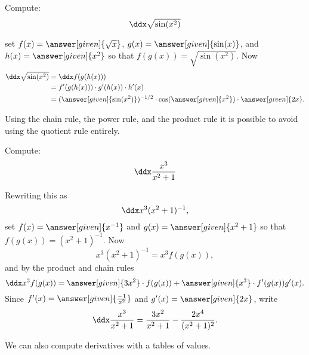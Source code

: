 \documentclass{ximera}
\begin{document}
\begin{example}
Compute:
\[
\ddx \sqrt{\sin(x^2)}
\]

\begin{explanation}
set $f(x) = \answer[given]{\sqrt{x}}$, $g(x) = \answer[given]{\sin(x)}$, and $h(x) = \answer[given]{x^2}$
so that $f(g(x)) = \sqrt{\sin(x^2)}$. Now
\begin{align*}
  \ddx \sqrt{\sin(x^2)} &= \ddx f(g(h(x)))\\
  &= f'(g(h(x))) \cdot g'(h(x)) \cdot h'(x)\\
  &= (\answer[given]{\sin(x^2)})^{-1/2} \cdot \cos(\answer[given]{x^2}) \cdot \answer[given]{2x}.
\end{align*}
\end{explanation}
\end{example}




Using the chain rule, the power rule, and the product rule it is
possible to avoid using the quotient rule entirely.

\begin{example}
Compute:
\[
\ddx \frac{x^3}{x^2+1}
\]

\begin{explanation}
Rewriting this as 
\[
\ddx x^3(x^2+1)^{-1}, 
\]
set $f(x) = \answer[given]{x^{-1}}$ and $g(x) = \answer[given]{x^2+1}$ so that $f(g(x)) = (x^2 + 1)^{-1}$. Now
\[
x^3(x^2+1)^{-1} = x^3 f(g(x)),
\]
and by the product and chain rules
\[
\ddx x^3 f(g(x)) = \answer[given]{3x^2} \cdot f(g(x))+ \answer[given]{x^3} \cdot f'(g(x))g'(x).
\]
Since $f'(x) = \answer[given]{\frac{-1}{x^2}}$ and $g'(x) = \answer[given]{2x}$, write
\[
\ddx \frac{x^3}{x^2+1} = \frac{3x^2}{x^2+1}-\frac{2x^4}{(x^2+1)^2}.
\]
\end{explanation}
\end{example}


We can also compute derivatives with a tables of values.
\end{document}
